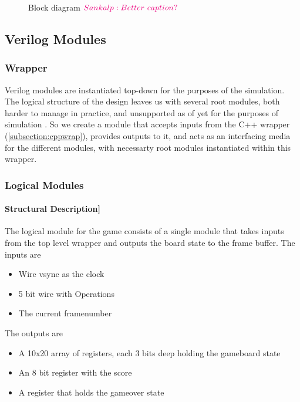 
\begin{figure}[h]
    \centering
    
    \caption{Block diagram $\sankalp{Better\ caption?}$}
\label{fig:blockdiag}
\end{figure}

\subsection{Verilog Modules}

\subsubsection{Wrapper}
Verilog modules are instantiated top-down for the purposes of the 
simulation. The logical structure of the design leaves us with 
several root modules, both harder to manage in practice, and 
unsupported as of yet for the purposes of simulation \cite{verilatortopmod}.
So we create a module that accepts inputs from the C++ wrapper (\ref{subsection:cppwrap}),
provides outputs to it, and acts as an interfacing media for the different
modules, with necessarty root modules instantiated within this wrapper.

\subsubsection{Logical Modules}
\label{subsection:logicalmod}
\paragraph{Structural Description]}
\label{paragraph:Structuraldescr}
The logical module for the game consists of a single module that takes inputs from the top level wrapper and outputs the board state to the frame buffer. \newline
The inputs are 
\begin{itemize}
    \item Wire vsync as the clock 
    \item 5 bit wire with Operations
    \item The current framenumber 
\end{itemize}

The outputs are 
\begin{itemize}
    \item A 10x20 array of registers, each 3 bits deep holding the gameboard state
    \item An 8 bit register with the score
    \item A register that holds the gameover state 
\end{itemize}

